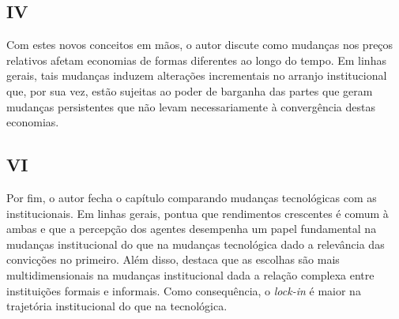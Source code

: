 \subsection*{IV}

Com estes novos conceitos em mãos, o autor discute como mudanças nos preços relativos afetam economias de formas diferentes ao longo do tempo. Em linhas gerais, tais mudanças induzem alterações incrementais no arranjo institucional que, por sua vez, estão sujeitas ao poder de barganha das partes que geram mudanças persistentes que não levam necessariamente à convergência destas economias.

\subsection*{VI}

Por fim, o autor fecha o capítulo comparando mudanças tecnológicas com as institucionais. Em linhas gerais, pontua que rendimentos crescentes é comum à ambas e que a percepção dos agentes desempenha um papel fundamental na mudanças institucional do que na mudanças tecnológica dado a relevância das convicções no primeiro. Além disso, destaca que as escolhas são mais multidimensionais na mudanças institucional dada a relação complexa entre instituições formais e informais. Como consequência, o \textit{lock-in} é maior na trajetória institucional do que na tecnológica.